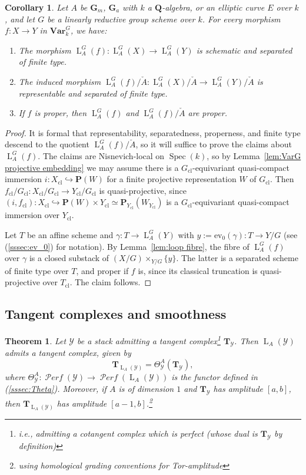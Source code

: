 \documentclass[12pt, oneside]{amsart}
\numberwithin{equation}{section}
\newtheorem{theorem}[subsubsection]{Theorem}
\newtheorem{corollary}[subsubsection]{Corollary}
\theoremstyle{remark}
\theoremstyle{plain}
\DeclareMathOperator{\PERF}{\mathcal{P}\textit{erf}}
\newcommand{\Loop}{\operatorname{L}}
\newcommand{\YY}{\mathcal{Y}}
\DeclareMathOperator{\spc}{Spec}
\newcommand{\GGa}{\mathbf{G}_{a}}
\newcommand{\GGm}{\mathbf{G}_{m}}
\newcommand{\Var}{\mathbf{Var}_{k}}
\newcommand{\TT}{\mathbf{T}}
\newcommand{\cl}{{\operatorname{cl}}}
\newcommand{\ev}{\mathrm{ev}}
\begin{document}
\begin{corollary}\label{mapsrepr}
Let $A$ be $\GGm$, $\GGa$ with $k$ a $\mathbf{Q}$-algebra, or an elliptic curve $E$ over $k$, and let $G$ be a linearly reductive group scheme over $k$.
For every morphism $f : X \to Y$ in $\Var^G$, we have:
\begin{enumerate}
	\item
	The morphism $\Loop_A^G(f) : \Loop_A^G(X) \to \Loop_A^G(Y)$ is schematic and separated of finite type.

	\item
	The induced morphism $\Loop_A^G(f)/\check{A} : \Loop_A^G(X)/\check{A} \to \Loop_A^G(Y)/\check{A}$ is representable and separated of finite type.

	\item
  If $f$ is proper, then $\Loop_A^G(f)$ and $\Loop_A^G(f)/\check{A}$ are proper.
\end{enumerate}
\end{corollary}
\begin{proof}
It is formal that representability, separatedness, properness, and finite type descend to the quotient $\Loop_A^G(f)/\check{A}$, so it will suffice to prove the claims about $\Loop_A^G(f)$.
The claims are Nisnevich-local on $\spc(k)$, so by Lemma~\ref{lem:VarG projective embedding} we may assume there is a $G_\cl$-equivariant quasi-compact immersion $i : X_\cl \hookrightarrow \mathbf{P}(W)$ for a finite projective representation $W$ of $G_\cl$.
Then $f_\cl/G_\cl : X_\cl/G_\cl \to Y_\cl/G_\cl$ is quasi-projective, since $(i, f_\cl) : X_\cl \hookrightarrow \mathbf{P}(W) \times Y_\cl \simeq \mathbf{P}_{Y_\cl}(W_{Y_\cl})$ is a $G_\cl$-equivariant quasi-compact immersion over $Y_\cl$.

Let $T$ be an affine scheme and $\gamma : T \to \Loop_A^G(Y)$ with $y := \ev_0(\gamma) : T \to Y/G$ (see (\ref{sssec:ev_0}) for notation).
By Lemma~\ref{lem:loop fibre}, the fibre of $\Loop_A^G(f)$ over $\gamma$ is a closed substack of $(X/G) \times_{Y/G} \{y\}$.
The latter is a separated scheme of finite type over $T$, and proper if $f$ is, since its classical truncation is quasi-projective over $T_\cl$.
The claim follows.
\end{proof}

\subsection{Tangent complexes and smoothness}

\begin{theorem}\label{tangent} Let $\YY$ be a stack admitting a tangent complex\footnote{%
  i.e., admitting a cotangent complex which is perfect (whose dual is $\TT_{\YY}$ by definition)
} $\TT_{\YY}$. Then $\Loop_A(\YY)$ admits a tangent complex, given by
$$\TT_{\Loop_A(\YY)} = \Theta^A_{\YY}(\TT_{\YY}),$$
where $\Theta^A_{\YY} : \PERF(\YY) \to \PERF(\Loop_A(\YY))$ is the functor defined in (\ref{sssec:Theta}).
Moreover, if $A$ is of dimension $1$ and $\TT_{\YY}$ has amplitude $[a,b]$, then $\TT_{\Loop_A(\YY)}$ has amplitude $[a-1,b]$.\footnote{%
  using homological grading conventions for Tor-amplitude
} \end{theorem}
\end{document}
